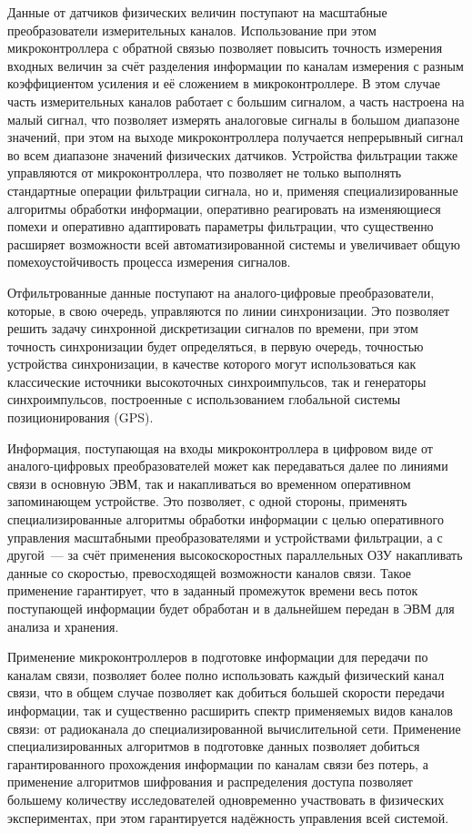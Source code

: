 \documentclass[a4paper, 14pt, titlepage]{extarticle}
\begin{document}
  Данные от датчиков физических величин поступают на масштабные преобразователи измерительных
  каналов. Использование при этом микроконтроллера с обратной связью позволяет повысить точность
  измерения входных величин за счёт разделения информации по каналам
  измерения с разным коэффициентом усиления и её сложением в микроконтроллере. В этом случае часть
  измерительных каналов работает с большим сигналом, а часть настроена на малый сигнал, что
  позволяет измерять аналоговые сигналы в большом диапазоне значений, при этом на выходе
  микроконтроллера получается непрерывный сигнал во всем диапазоне значений физических датчиков.
  Устройства фильтрации также управляются от микроконтроллера, что позволяет не только выполнять
  стандартные операции фильтрации сигнала, но и, применяя специализированные алгоритмы обработки
  информации, оперативно реагировать на изменяющиеся помехи и оперативно адаптировать параметры
  фильтрации, что существенно расширяет возможности всей автоматизированной системы и увеличивает
  общую помехоустойчивость процесса измерения сигналов.

  Отфильтрованные данные поступают на аналого-цифровые преобразователи, которые, в свою очередь,
  управляются по линии синхронизации. Это позволяет решить задачу синхронной дискретизации сигналов
  по времени, при этом точность синхронизации будет определяться, в первую очередь, точностью
  устройства синхронизации, в качестве которого могут использоваться как классические источники
  высокоточных синхроимпульсов, так и генераторы синхроимпульсов, построенные с использованием
  глобальной системы позиционирования (GPS).

  Информация, поступающая на входы микроконтроллера в цифровом виде от аналого-цифровых
  преобразователей может как передаваться далее по линиями связи в основную ЭВМ, так и
  накапливаться во временном оперативном запоминающем устройстве. Это позволяет, с одной стороны,
  применять специализированные алгоритмы обработки информации с целью оперативного управления
  масштабными преобразователями и устройствами фильтрации, а с другой~--- за счёт применения
  высокоскоростных параллельных ОЗУ накапливать данные со скоростью, превосходящей возможности
  каналов связи. Такое применение гарантирует, что в заданный промежуток времени весь поток
  поступающей информации будет обработан и в дальнейшем передан в ЭВМ для анализа и хранения.

  Применение микроконтроллеров в подготовке информации для передачи по каналам связи, позволяет
  более полно использовать каждый физический канал связи, что в общем случае позволяет как добиться
  большей скорости передачи информации, так и существенно расширить спектр применяемых видов каналов
  связи: от радиоканала до специализированной вычислительной сети. Применение специализированных
  алгоритмов в подготовке данных позволяет добиться гарантированного прохождения информации по
  каналам связи без потерь, а применение алгоритмов шифрования и распределения доступа позволяет
  большему количеству исследователей одновременно участвовать в физических экспериментах, при этом
  гарантируется надёжность управления всей системой.
\end{document}
